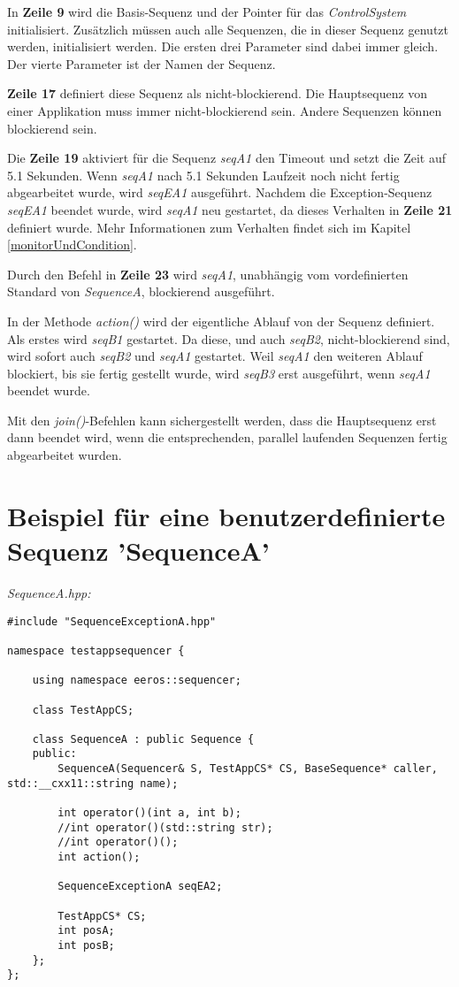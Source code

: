 In \textbf{Zeile 9} wird die Basis-Sequenz und der Pointer für das \textit{ControlSystem} initialisiert.
Zusätzlich müssen auch alle Sequenzen, die in dieser Sequenz genutzt werden, initialisiert werden.
Die ersten drei Parameter sind dabei immer gleich.
Der vierte Parameter ist der Namen der Sequenz.

\textbf{Zeile 17} definiert diese Sequenz als nicht-blockierend.
Die Hauptsequenz von einer Applikation muss immer nicht-blockierend sein.
Andere Sequenzen können blockierend sein.

Die \textbf{Zeile 19} aktiviert für die Sequenz \textit{seqA1} den Timeout und setzt die Zeit auf 5.1 Sekunden.
Wenn \textit{seqA1} nach 5.1 Sekunden Laufzeit noch nicht fertig abgearbeitet wurde, wird \textit{seqEA1} ausgeführt.
Nachdem die Exception-Sequenz \textit{seqEA1} beendet wurde, wird \textit{seqA1} neu gestartet, da dieses Verhalten in \textbf{Zeile 21} definiert wurde.
Mehr Informationen zum Verhalten findet sich im Kapitel \ref{monitorUndCondition}.

Durch den Befehl in \textbf{Zeile 23} wird \textit{seqA1}, unabhängig vom vordefinierten Standard von \textit{SequenceA}, blockierend ausgeführt.

In der Methode \textit{action()} wird der eigentliche Ablauf von der Sequenz definiert.
Als erstes wird \textit{seqB1} gestartet.
Da diese, und auch \textit{seqB2}, nicht-blockierend sind, wird sofort auch \textit{seqB2} und \textit{seqA1} gestartet.
Weil \textit{seqA1} den weiteren Ablauf blockiert, bis sie fertig gestellt wurde, wird \textit{seqB3} erst ausgeführt, wenn \textit{seqA1} beendet wurde.

Mit den \textit{join()}-Befehlen kann sichergestellt werden, dass die Hauptsequenz erst dann beendet wird, wenn die entsprechenden, parallel laufenden Sequenzen fertig abgearbeitet wurden.


\section{Beispiel für eine benutzerdefinierte Sequenz 'SequenceA'}

\textit{SequenceA.hpp:}\
\begin{lstlisting}
#include "SequenceExceptionA.hpp"

namespace testappsequencer {
	
	using namespace eeros::sequencer;
	
	class TestAppCS;
	
	class SequenceA : public Sequence {
	public:
		SequenceA(Sequencer& S, TestAppCS* CS, BaseSequence* caller, std::__cxx11::string name);
		
		int operator()(int a, int b);
		//int operator()(std::string str);
		//int operator()();
		int action();
		
		SequenceExceptionA seqEA2;
		
		TestAppCS* CS;
		int posA;
		int posB;
	};
};
\end{lstlisting}

